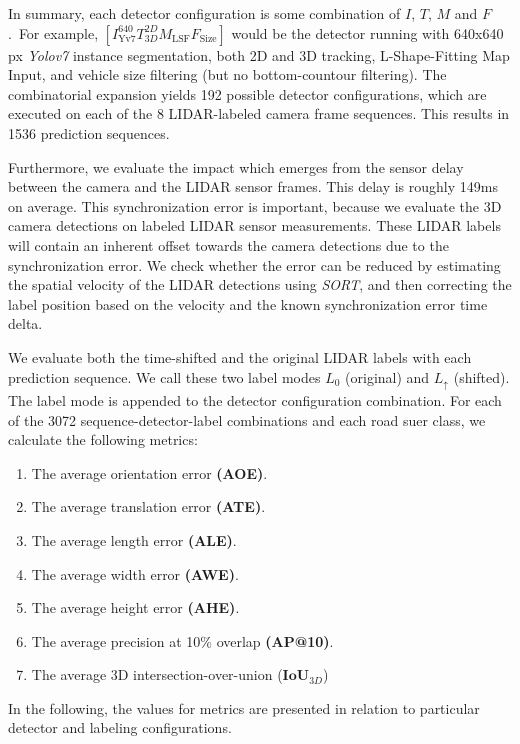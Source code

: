 In summary, each detector configuration is some combination of $I$, $T$, $M$ and $F$.\ For example, $\left[I^{640}_\text{Yv7}T^{2D}_{3D}M_\text{LSF}F_\text{Size}\right]$ would be the detector running with 640x640 px \textit{Yolov7} instance segmentation, both 2D and 3D tracking, L-Shape-Fitting Map Input, and vehicle size filtering (but no bottom-countour filtering).
The combinatorial expansion yields 192 possible detector configurations, which are executed on each of the 8 LIDAR-labeled camera frame sequences.
This results in 1536 prediction sequences.

Furthermore, we evaluate the impact which emerges from the sensor delay between the camera and the LIDAR sensor frames.
This delay is roughly 149ms on average.
This synchronization error is important, because we evaluate the 3D camera detections on labeled LIDAR sensor measurements.
These LIDAR labels will contain an inherent offset towards the camera detections due to the synchronization error.
We check whether the error can be reduced by estimating the spatial velocity of the LIDAR detections using \textit{SORT}, and then correcting the label position based on the velocity and the known synchronization error time delta.

We evaluate both the time-shifted and the original LIDAR labels with each prediction sequence.
We call these two label modes $L_0$ (original) and $L_{\uparrow}$ (shifted).
The label mode is appended to the detector configuration combination.
For each of the 3072 sequence-detector-label combinations and each road suer class, we calculate the following metrics:

\begin{enumerate}
    \item The average orientation error \textbf{(AOE)}.
    \item The average translation error \textbf{(ATE)}.
    \item The average length error \textbf{(ALE)}.
    \item The average width error \textbf{(AWE)}.
    \item The average height error \textbf{(AHE)}.
    \item The average precision at 10\% overlap \textbf{(AP@10)}.
    \item The average 3D intersection-over-union ($\mathbf{IoU}_{3D}$)
\end{enumerate}

In the following, the values for metrics are presented in relation to particular detector and labeling configurations.

